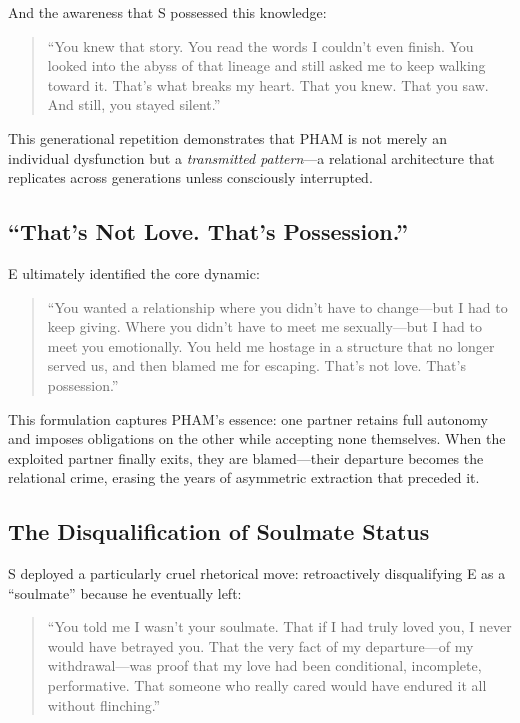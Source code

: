 \documentclass[12pt,openany]{book}
\numberwithin{equation}{chapter}
\begin{document}
And the awareness that S possessed this knowledge:

\begin{quote}
``You knew that story. You read the words I couldn't even finish. You looked into the abyss of that lineage and still asked me to keep walking toward it. That's what breaks my heart. That you knew. That you saw. And still, you stayed silent.''
\end{quote}

This generational repetition demonstrates that PHAM is not merely an individual dysfunction but a \textit{transmitted pattern}---a relational architecture that replicates across generations unless consciously interrupted.

\subsection{``That's Not Love. That's Possession.''}

E ultimately identified the core dynamic:

\begin{quote}
``You wanted a relationship where you didn't have to change---but I had to keep giving. Where you didn't have to meet me sexually---but I had to meet you emotionally. You held me hostage in a structure that no longer served us, and then blamed me for escaping. That's not love. That's possession.''
\end{quote}

This formulation captures PHAM's essence: one partner retains full autonomy and imposes obligations on the other while accepting none themselves. When the exploited partner finally exits, they are blamed---their departure becomes the relational crime, erasing the years of asymmetric extraction that preceded it.

\subsection{The Disqualification of Soulmate Status}

S deployed a particularly cruel rhetorical move: retroactively disqualifying E as a ``soulmate'' because he eventually left:

\begin{quote}
``You told me I wasn't your soulmate. That if I had truly loved you, I never would have betrayed you. That the very fact of my departure---of my withdrawal---was proof that my love had been conditional, incomplete, performative. That someone who really cared would have endured it all without flinching.''
\end{quote}
\end{document}
